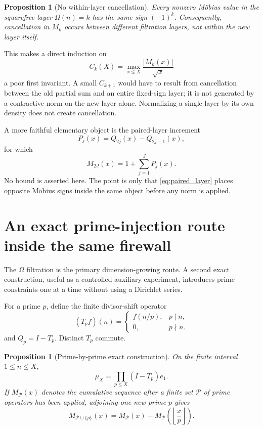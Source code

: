 \documentclass[11pt]{amsart}
\numberwithin{equation}{section}
\theoremstyle{plain}
\newtheorem{proposition}[theorem]{Proposition}
\theoremstyle{definition}
\theoremstyle{remark}
\begin{document}
\begin{proposition}[No within-layer cancellation]
\label{prop:no_within_layer_cancellation}
Every nonzero M\"obius value in the squarefree layer $\Omega(n)=k$ has the same sign $(-1)^k$.
Consequently, cancellation in $M_k$ occurs between different filtration layers, not within the
new layer itself.
\end{proposition}

This makes a direct induction on
\[
C_k(X)=
\max_{x\le X}\frac{|M_k(x)|}{\sqrt x}
\]
a poor first invariant.  A small $C_{k+1}$ would have to result from cancellation between the
old partial sum and an entire fixed-sign layer; it is not generated by a contractive norm on the
new layer alone.  Normalizing a single layer by its own density does not create cancellation.

A more faithful elementary object is the paired-layer increment
\begin{equation}
P_j(x)=Q_{2j}(x)-Q_{2j-1}(x),
\label{eq:paired_layer}
\end{equation}
for which
\begin{equation}
M_{2J}(x)=1+\sum_{j=1}^J P_j(x).
\label{eq:paired_reconstruction}
\end{equation}
No bound is asserted here.  The point is only that \eqref{eq:paired_layer} places opposite
M\"obius signs inside the same object before any norm is applied.


\section{An exact prime-injection route inside the same firewall}
\label{sec:prime_injection_route}

The $\Omega$ filtration is the primary dimension-growing route.  A second exact construction,
useful as a controlled auxiliary experiment, introduces prime constraints one at a time without
using a Dirichlet series.

For a prime $p$, define the finite divisor-shift operator
\begin{equation}
(T_pf)(n)
=
\begin{cases}
f(n/p),&p\mid n,\\
0,&p\nmid n.
\end{cases}
\label{eq:Tp}
\end{equation}
and $Q_p=I-T_p$.  Distinct $T_p$ commute.

\begin{proposition}[Prime-by-prime exact construction]
\label{prop:prime_by_prime_mu}
On the finite interval $1\le n\le X$,
\begin{equation}
\mu_X
=
\prod_{p\le X}(I-T_p)e_1.
\label{eq:prime_product_mu}
\end{equation}
If $M_{\mathcal P}(x)$ denotes the cumulative sequence after a finite set
$\mathcal P$ of prime operators has been applied, adjoining one new prime $p$ gives
\begin{equation}
M_{\mathcal P\cup\{p\}}(x)
=
M_{\mathcal P}(x)
-
M_{\mathcal P}
\left(\left\lfloor\frac xp\right\rfloor\right).
\label{eq:prime_floor_update}
\end{equation}
\end{proposition}
\end{document}
